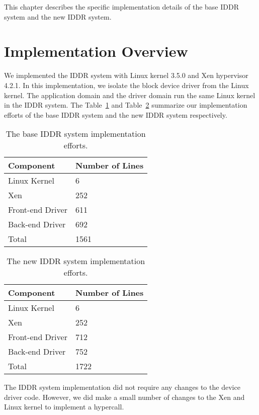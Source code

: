 This chapter describes the specific implementation details of the base IDDR system and the new IDDR system.

\section{Implementation Overview} 
We implemented the IDDR system with Linux kernel 3.5.0 and Xen hypervisor 4.2.1. In this implementation, we isolate the block device driver from the Linux kernel. The application domain and the driver domain run the same Linux kernel in the IDDR system. The Table~\ref{tab:base} and Table~\ref{tab:new} summarize our implementation efforts of the base IDDR system and the new IDDR system respectively.

\begin{table}
\caption{The base IDDR system implementation efforts.}
\begin{center}
\begin{tabular}{ll}
  \hline
  \label{tab:base}
  Component & Number of Lines \\
  \hline
  Linux Kernel & 6 \\
  Xen & 252 \\
  Front-end Driver & 611 \\
  Back-end Driver & 692 \\
  \hline 
  Total & 1561\\
  \hline
\end{tabular}
\end{center}
\end{table}

\begin{table}
\caption{The new IDDR system implementation efforts.}
\begin{center}
\begin{tabular}{ll}
  \hline
  \label{tab:new}
  Component & Number of Lines \\
  \hline
  Linux Kernel & 6 \\
  Xen & 252 \\
  Front-end Driver & 712 \\
  Back-end Driver & 752 \\
  \hline 
  Total & 1722\\
  \hline
\end{tabular}
\end{center}
\end{table}

The IDDR system implementation did not require any changes to the device driver code. However, we did make a small number of changes to the Xen and Linux kernel to implement a hypercall.

